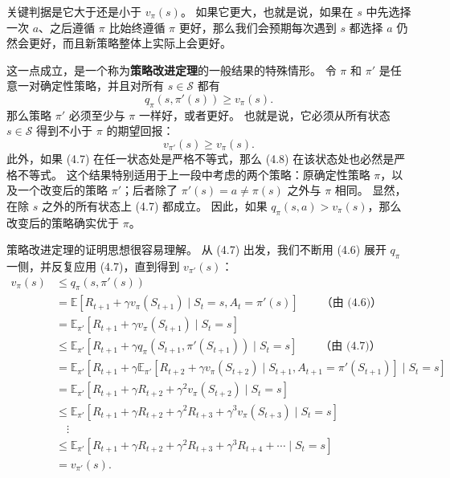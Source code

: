\documentclass[UTF8,12pt,a4paper,fontset=fandol]{ctexart}
\begin{document}
关键判据是它大于还是小于 $v_\pi(s)$。
如果它更大，也就是说，如果在 $s$ 中先选择一次 $a$、之后遵循 $\pi$ 比始终遵循 $\pi$ 更好，那么我们会预期每次遇到 $s$ 都选择 $a$ 仍然会更好，而且新策略整体上实际上会更好。

这一点成立，是一个称为\textbf{策略改进定理}的一般结果的特殊情形。
令 $\pi$ 和 $\pi'$ 是任意一对确定性策略，并且对所有 $s\in\mathcal{S}$ 都有
\begin{equation}
q_\pi(s,\pi'(s))\ge v_\pi(s).
\tag{4.7}
\end{equation}
那么策略 $\pi'$ 必须至少与 $\pi$ 一样好，或者更好。
也就是说，它必须从所有状态 $s\in\mathcal{S}$ 得到不小于 $\pi$ 的期望回报：
\begin{equation}
v_{\pi'}(s)\ge v_\pi(s).
\tag{4.8}
\end{equation}
此外，如果 (4.7) 在任一状态处是严格不等式，那么 (4.8) 在该状态处也必然是严格不等式。
这个结果特别适用于上一段中考虑的两个策略：原确定性策略 $\pi$，以及一个改变后的策略 $\pi'$；后者除了 $\pi'(s)=a\ne\pi(s)$ 之外与 $\pi$ 相同。
显然，在除 $s$ 之外的所有状态上 (4.7) 都成立。
因此，如果 $q_\pi(s,a)>v_\pi(s)$，那么改变后的策略确实优于 $\pi$。

策略改进定理的证明思想很容易理解。
从 (4.7) 出发，我们不断用 (4.6) 展开 $q_\pi$ 一侧，并反复应用 (4.7)，直到得到 $v_{\pi'}(s)$：
\[
\begin{aligned}
v_\pi(s)
&\le q_\pi(s,\pi'(s))\\
&= \mathbb{E}[R_{t+1}+\gamma v_\pi(S_{t+1})\mid S_t=s,A_t=\pi'(s)] \qquad \text{（由 (4.6)）}\\
&= \mathbb{E}_{\pi'}[R_{t+1}+\gamma v_\pi(S_{t+1})\mid S_t=s]\\
&\le \mathbb{E}_{\pi'}[R_{t+1}+\gamma q_\pi(S_{t+1},\pi'(S_{t+1}))\mid S_t=s] \qquad \text{（由 (4.7)）}\\
&= \mathbb{E}_{\pi'}[R_{t+1}+\gamma\mathbb{E}_{\pi'}[R_{t+2}+\gamma v_\pi(S_{t+2})\mid S_{t+1},A_{t+1}=\pi'(S_{t+1})]\mid S_t=s]\\
&= \mathbb{E}_{\pi'}[R_{t+1}+\gamma R_{t+2}+\gamma^2v_\pi(S_{t+2})\mid S_t=s]\\
&\le \mathbb{E}_{\pi'}[R_{t+1}+\gamma R_{t+2}+\gamma^2R_{t+3}+\gamma^3v_\pi(S_{t+3})\mid S_t=s]\\
&\quad\vdots\\
&\le \mathbb{E}_{\pi'}[R_{t+1}+\gamma R_{t+2}+\gamma^2R_{t+3}+\gamma^3R_{t+4}+\cdots\mid S_t=s]\\
&= v_{\pi'}(s).
\end{aligned}
\]
\end{document}
